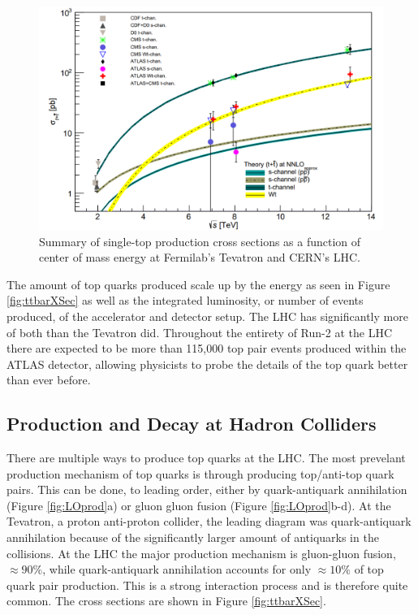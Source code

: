 \begin{figure}[h!]
	\centering
	\includegraphics[width=\columnwidth]{../ThesisImages/Theory/singtprodxsec.png}
	\caption[Summary of single-top production cross sections as a function of center of mass energy at Fermilab's Tevatron and CERN's LHC.]{Summary of single-top production cross sections as a function of center of mass energy at Fermilab's Tevatron and CERN's LHC\cite{TopWG}.}
	\label{fig:singtXSec}
\end{figure}

 The amount of top quarks produced scale up by the energy as seen in Figure \ref{fig:ttbarXSec} as well as the integrated luminosity, or number of events produced, of the accelerator and detector setup.  The LHC has significantly more of both than the Tevatron did.  Throughout the entirety of Run-2 at the LHC there are expected to be more than 115,000 top pair events produced within the ATLAS detector, allowing physicists to probe the details of the top quark better than ever before.  


\subsection{Production and Decay at Hadron Colliders}

There are multiple ways to produce top quarks at the LHC.  The most prevelant production mechanism of top quarks is through producing top/anti-top quark pairs.  This can be done, to leading order, either by quark-antiquark annihilation (Figure \ref{fig:LOprod}a) or gluon gluon fusion (Figure \ref{fig:LOprod}b-d).  At the Tevatron, a proton anti-proton collider, the leading diagram was quark-antiquark annihilation because of the significantly larger amount of antiquarks in the collisions.  At the LHC the major production mechanism is gluon-gluon fusion, $\approx 90\%$, while quark-antiquark annihilation accounts for only $\approx 10\%$  of top quark pair production.  This is a strong interaction process and is therefore quite common.  The cross sections are shown in Figure \ref{fig:ttbarXSec}.


